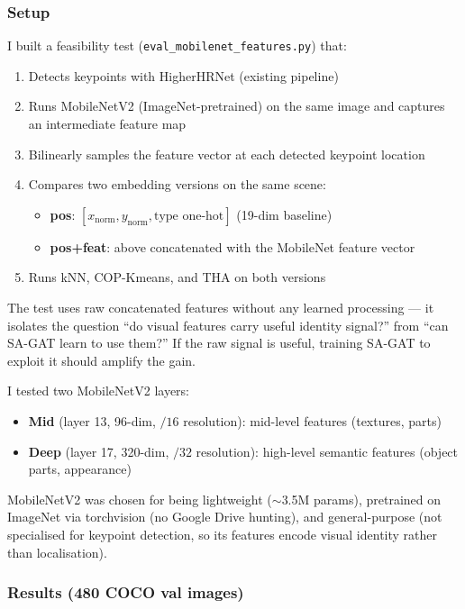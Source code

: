 \subsubsection{Setup}

I built a feasibility test (\texttt{eval\_mobilenet\_features.py}) that:
\begin{enumerate}
    \item Detects keypoints with HigherHRNet (existing pipeline)
    \item Runs MobileNetV2 (ImageNet-pretrained) on the same image and captures an intermediate feature map
    \item Bilinearly samples the feature vector at each detected keypoint location
    \item Compares two embedding versions on the same scene:
    \begin{itemize}
        \item \textbf{pos}: $[x_{\text{norm}}, y_{\text{norm}}, \text{type one-hot}]$ (19-dim baseline)
        \item \textbf{pos+feat}: above concatenated with the MobileNet feature vector
    \end{itemize}
    \item Runs kNN, COP-Kmeans, and THA on both versions
\end{enumerate}

The test uses raw concatenated features without any learned processing --- it isolates the question ``do visual features carry useful identity signal?'' from ``can SA-GAT learn to use them?'' If the raw signal is useful, training SA-GAT to exploit it should amplify the gain.

I tested two MobileNetV2 layers:
\begin{itemize}
    \item \textbf{Mid} (layer 13, 96-dim, $/16$ resolution): mid-level features (textures, parts)
    \item \textbf{Deep} (layer 17, 320-dim, $/32$ resolution): high-level semantic features (object parts, appearance)
\end{itemize}

MobileNetV2 was chosen for being lightweight ($\sim$3.5M params), pretrained on ImageNet via torchvision (no Google Drive hunting), and general-purpose (not specialised for keypoint detection, so its features encode visual identity rather than localisation).

\subsubsection{Results (480 COCO val images)}

